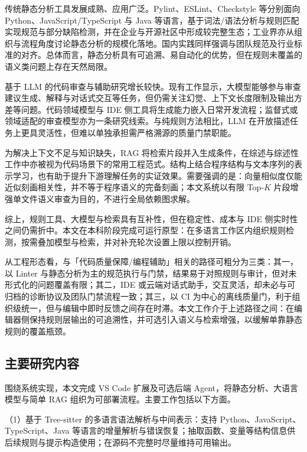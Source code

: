 传统静态分析工具发展成熟、应用广泛。Pylint、ESLint、Checkstyle 等分别面向 Python、JavaScript/TypeScript 与 Java 等语言，基于词法/语法分析与规则匹配实现规范与部分缺陷检测，并在企业与开源社区中形成较完整生态；工业界亦从组织与流程角度讨论静态分析的规模化落地\cite{sadowski2018scaling}。国内实践同样强调与团队规范及行业标准的对齐。总体而言，静态分析具有可追溯、易自动化的优势，但在规则未覆盖的语义类问题上存在天然局限\cite{bacchelli2013expectations}。

基于 LLM 的代码审查与辅助研究增长较快。现有工作显示，大模型能够参与审查建议生成、解释与对话式交互等任务，但仍需关注幻觉、上下文长度限制及输出方差等问题\cite{hou2024llmse,zhang2024surveyllmse}。代码领域模型与 IDE 侧工具将生成能力嵌入日常开发流程\cite{roziere2023codellama}；监督式或领域适配的审查模型亦为一条研究线索\cite{li2022codereviewer}。与纯规则方法相比，LLM 在开放描述任务上更具灵活性，但难以单独承担需严格溯源的质量门禁职能。

为解决上下文不足与知识缺失，RAG 将检索片段并入生成条件，在综述与综述性工作中亦被视为代码场景下的常用工程范式\cite{lewis2020retrieval,zhang2024surveyllmse,hou2024llmse}。结构上结合程序结构与文本序列的表示学习，也有助于提升下游理解任务的实证效果\cite{guo2020graphcodebert,feng2020codebert}。需要强调的是：向量相似度仅能近似刻画相关性，并不等于程序语义的完备刻画；本文系统以有限 Top-$K$ 片段增强单文件语义审查为目的，不进行全局依赖图求解。

综上，规则工具、大模型与检索具有互补性，但在稳定性、成本与 IDE 侧实时性之间仍需折中。本文在本科阶段完成可运行原型：在多语言工作区内组织规则检测，按需叠加模型与检索，并对补充轮次设置上限以控制开销。

从工程形态看，与「代码质量保障/编程辅助」相关的路径可粗分为三类：其一，以 Linter 与静态分析为主的规范执行与门禁，结果易于对照规则与审计，但对未形式化的问题覆盖有限；其二，IDE 或云端对话式助手，交互灵活，却未必与可归档的诊断协议及团队门禁流程一致；其三，以 CI 为中心的离线质量门，利于组织级统一，但与编辑中即时反馈之间存在时滞。本文工作介于上述路径之间：在编辑器侧保持规则层输出的可追溯性，并可选引入语义与检索增强，以缓解单靠静态规则的覆盖瓶颈。

\subsection{主要研究内容}
围绕系统实现，本文完成 VS Code 扩展及可选后端 Agent，将静态分析、大语言模型与简单 RAG 组织为可部署流程。主要工作包括以下方面。

（1）基于 Tree-sitter 的多语言语法解析与中间表示：支持 Python、JavaScript、TypeScript、Java 等语言的增量解析与错误恢复\cite{github2025treesitter}；抽取函数、变量等结构信息供后续规则与提示构造使用\cite{guo2020graphcodebert,feng2020codebert}；在源码不完整时尽量维持可用输出。

